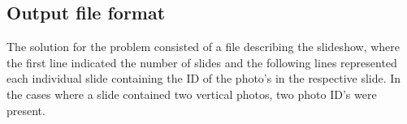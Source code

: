 \documentclass{article}
\begin{document}
\subsection{Output file format}
The solution for the problem consisted of a file describing the slideshow, where the first line indicated the number of slides and the following lines
represented each individual slide containing the ID of the photo's in the respective slide.
In the cases where a slide contained two vertical photos, two photo ID's were present.
\end{document}
